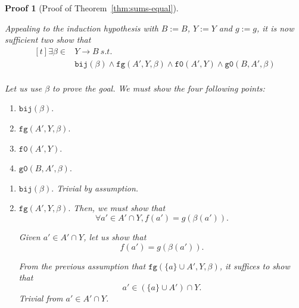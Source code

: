 \documentclass[pdflatex,sn-mathphys]{sn-jnl}%
\theoremstyle{thmstyleone}%
\theoremstyle{thmstyletwo}%
\newtheorem*{pf}{Proof}%
\theoremstyle{thmstylethree}%
\begin{document}
\begin{appendices}
\begin{pf}[Proof of Theorem~\ref{thm:sums-equal}]
\begin{enumerate}
\begin{enumerate}
           Appealing to the induction hypothesis with $B:=B$, $Y:=Y$
           and $g:=g$, it is now sufficient two show that
           \begin{equation*}
             \boxed{
               \begin{aligned}[t]
                 \exists{}\beta\in{}&Y\rightarrow{}B~s.t.~\\
                                    & \mathtt{bij}(\beta)\land\mathtt{fg}(A',Y,\beta)\land\mathtt{f0}(A',Y)\land\mathtt{g0}(B,A',\beta) \\
               \end{aligned}
             }
           \end{equation*}

           Let us use $\beta$ to prove the goal. We must show the four following points:
           \begin{enumerate}
           \item $\boxed{\mathtt{bij}(\beta).}$
           \item $\boxed{\mathtt{fg}(A',Y,\beta).}$
           \item $\boxed{\mathtt{f0}(A',Y).}$
           \item $\boxed{\mathtt{g0}(B,A',\beta).}$
           \end{enumerate}

           \vspace{10pt}

           \begin{enumerate}
           \item $\boxed{\mathtt{bij}(\beta).}$ Trivial by assumption.
           \item $\boxed{\mathtt{fg}(A',Y,\beta).}$ Then, we must show that
             \begin{equation*}
               \boxed{\forall{}a'\in{}A'\cap{}Y,f(a')=g(\beta(a')).}
             \end{equation*}

             Given $a'\in{}A'\cap{}Y$, let us show that
             \begin{equation*}
               \boxed{f(a')=g(\beta(a')).}
             \end{equation*}

             From the previous assumption that
             $\mathtt{fg}(\{a\}\cup{}A',Y,\beta)$, it suffices to show
             that
             \begin{equation*}
               \boxed{a'\in(\{a\}\cup{}A')\cap{}Y.}
             \end{equation*}
             Trivial from $a'\in{}A'\cap{}Y$.
             

\end{enumerate}
\end{enumerate}
\end{enumerate}
\end{pf}
\end{appendices}
\end{document}

